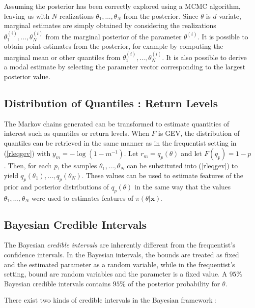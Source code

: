 Assuming the posterior has been correctly explored using a MCMC algorithm, leaving us with $N$ realizations $\theta_1,\ldots,\theta_N$ from the posterior. Since $\theta$ is $d$-variate, marginal estimates are simply obtained by considering the realizations $\theta_1^{(i)},\ldots,\theta_N^{(i)}$  from the marginal posterior of the parameter $\theta^{(i)}$. It is possible to obtain point-estimates from the posterior, for example by computing the marginal mean or other quantiles from  $\theta_1^{(i)},\ldots,\theta_N^{(i)}$. It is also possible to derive a modal estimate by selecting the parameter vector corresponding to the largest posterior value.

\subsection{Distribution of Quantiles : Return Levels}

The Markov chains generated can be transformed to estimate quantities of interest such as quantiles or return levels.
When $F$ is GEV, the distribution of quantiles can be retrieved in the same manner as in the frequentist setting in (\ref{rleqgev}) with $y_m = -\log(1-m^{-1})$. Let $r_m= q_p(\theta)$ and let $F(q_p)=1-p$. Then, for each $p$, the samples $\theta_1,\ldots,\theta_N$ can be substituted into (\ref{rleqgev}) to yield $q_p(\theta_1),\ldots,q_p(\theta_N)$. These values can be used to estimate features of the prior and posterior distributions of $q_p(\theta)$ in the same way that the values $\theta_1,\ldots,\theta_N$ were used to estimates features of $\pi(\theta|\boldsymbol{x})$. 


\subsection{Bayesian Credible Intervals}\label{bayes_cred_int}

The Bayesian \emph{credible intervals} are inherently different from the frequentist's confidence intervals. In the Bayesian intervals, the bounds are treated as fixed and the estimated parameter as a random variable, while in the frequentist's setting, bound are random variables and the parameter is a fixed value. A $95\%$ Bayesian credible intervals contains $95\%$ of the posterior probability for $\theta$.

There exist two kinds of credible intervals in the Bayesian framework : 

